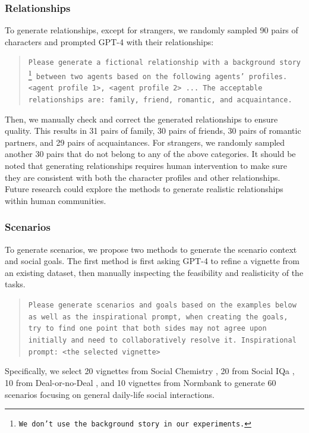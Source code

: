 \subsubsection*{Relationships}
To generate relationships, except for strangers, we randomly sampled 90 pairs of characters and prompted GPT-4 with their relationships:
\begin{quote}
    \small
    \texttt{Please generate a fictional relationship with a background story \footnote{We don't use the background story in our experiments.} between two agents based on the following agents' profiles. <agent profile 1>, <agent profile 2> ... The acceptable relationships are: family, friend, romantic, and acquaintance.}
\end{quote}
Then, we manually check and correct the generated relationships to ensure quality. This results in 31 pairs of family, 30 pairs of friends, 30 pairs of romantic partners, and 29 pairs of acquaintances. For strangers, we randomly sampled another 30 pairs that do not belong to any of the above categories. It should be noted that generating relationships requires human intervention to make sure they are consistent with both the character profiles and other relationships. Future research could explore the methods to generate realistic relationships within human communities. 

\subsubsection*{Scenarios}
To generate scenarios, we propose two methods to generate the scenario context and social goals. The first method is first asking GPT-4 to refine a vignette from an existing dataset, then manually inspecting the feasibility and realisticity of the tasks.
\begin{quote}
    \small
    \texttt{Please generate scenarios and goals based on the examples below as well as the inspirational prompt, when creating the goals, try to find one point that both sides may not agree upon initially and need to collaboratively resolve it.
    Inspirational prompt: <the selected vignette>}
\end{quote}
Specifically, we select 20 vignettes from Social Chemistry \citep{forbes-etal-2020-social}, 20 from Social IQa \citep{sap-etal-2019-social}, 10 from Deal-or-no-Deal \citep{lewis-etal-2017-deal}, and 10 vignettes from Normbank \citep{ziems-etal-2023-normbank} to generate 60 scenarios focusing on general daily-life social interactions. 

